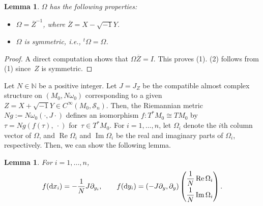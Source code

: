 \documentclass[pdftex]{sigma}
\numberwithin{equation}{section}
\newtheorem{Lemma}[Theorem]{Lemma}
\newcommand{\N}{\mathbb{N}}
\def\re{\operatorname{Re}}
\def\im{\operatorname{Im}}
\begin{document}
\begin{Lemma}\label{property of Omega} $\Omega$ has the following properties:
\begin{itemize}\itemsep=0pt
\item[$(1)$] $\Omega={\overline Z}^{-1}$, where ${\overline Z}=X-\sqrt{-1}Y$.
\item[$(2)$] $\Omega$ is symmetric, i.e., ${}^t\Omega=\Omega$.
\end{itemize}
\end{Lemma}
\begin{proof}
A direct computation shows that $\Omega{\overline Z}=I$. This proves (1). (2) follows from (1) since~$Z$ is symmetric.
\end{proof}

Let $N\in \N$ be a positive integer. Let $J=J_Z$ be the compatible almost complex structure on $(M_0,N\omega_0)$ corresponding to a given $Z=X+\sqrt{-1}Y\in C^\infty ( M_0,{\mathcal S}_n)$. Then, the Riemannian metric $Ng:=N\omega_0 (\cdot , J\cdot )$ defines an isomorphism $f\colon T^*M_0\cong TM_0$ by $\tau=Ng\left( f(\tau),\ \cdot \right)$ for~${\tau \in T^*M_0}$. For $i=1,\ldots ,n$, let $\Omega_i$ denote the $i$th column vector of $\Omega$, and $\re\Omega_i$ and $\im\Omega_i$ be the real and imaginary parts of $\Omega_i$, respectively. Then, we can show the following lemma.
\begin{Lemma}\label{dual}
For $i=1,\ldots ,n$,
\[
f({\rm d}x_i)=-\frac{1}{N}J\partial_{y_i},\qquad f({\rm d}y_i)=(-J\partial_y, \partial_y)
\begin{pmatrix}
\dfrac{1}{N}\re\Omega_i \vspace{1mm}\\
\dfrac{1}{N}\im\Omega_i
\end{pmatrix}.
\]
\end{Lemma}
\end{document}
